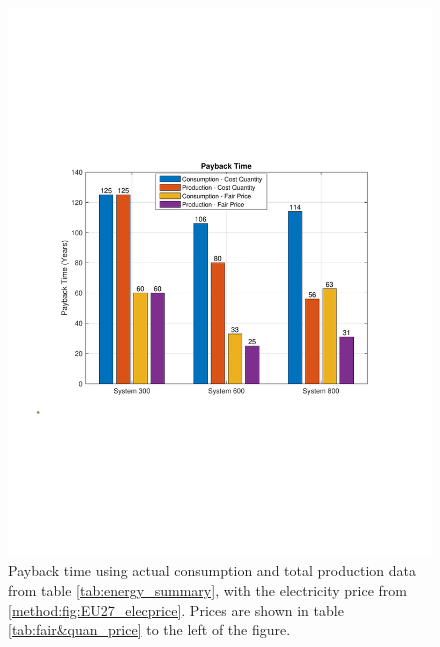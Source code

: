 \begin{minipage}[t]{0.65\textwidth} %
    \begin{figure}[H]
        \centering
        \includegraphics[width=\linewidth]{photos/PaybackTime_comparison_barChart.pdf} %
        \captionsetup{font=small}
        \caption{Payback time using actual consumption and total production data from table \ref{tab:energy_summary}, with the electricity price from \ref{method:fig:EU27_elecprice}. Prices are shown in table \ref{tab:fair&quan_price} to the left of the figure.}
        \label{result:fig:paybacktime}
    \end{figure}
\end{minipage}%
